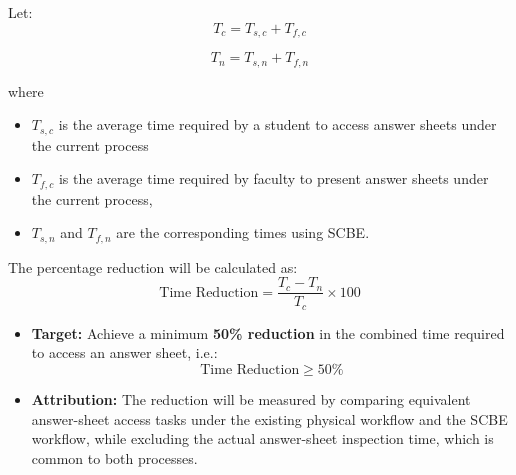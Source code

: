 \documentclass[11pt,a4paper]{article}
\begin{document}
Let:
\[
T_c = T_{s,c} + T_{f,c}
\]

\[
T_n = T_{s,n} + T_{f,n}
\]


\newenvironment{where}{\noindent{}where\begin{itemize}}{\end{itemize}}

\begin{where}
  \item $T_{s,c}$ is the average time required by a student to access answer sheets under the current process
  \item $T_{f,c}$ is the average time required by faculty to present answer sheets under the current process,
  \item $T_{s,n}$ and $T_{f,n}$ are the corresponding times using SCBE.
\end{where}

The percentage reduction will be calculated as:
\[
\text{Time Reduction} = \frac{T_c-T_n}{T_c}\times100
\]

\begin{itemize}[leftmargin=0.7cm]
    \item \textbf{Target:} Achieve a minimum \textbf{50\% reduction} in the combined time required to access an answer sheet, i.e.:\\
    \[\text{Time Reduction} \geq 50\%\]
    \item \textbf{Attribution:} The reduction will be measured by comparing equivalent answer-sheet access tasks under the existing physical workflow and the SCBE workflow, while excluding the actual answer-sheet inspection time, which is common to both processes.
\end{itemize}
\end{document}
